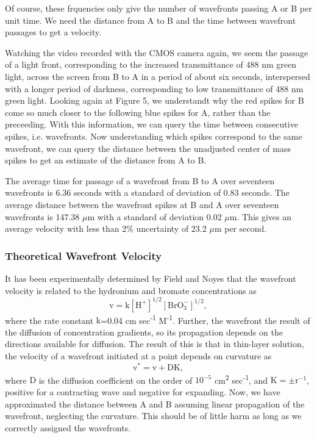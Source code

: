 \documentclass{article}
\begin{document}
Of course, these frquencies only give the number of wavefronts passing A or B per unit 
time. We need the distance from A to B and the time between wavefront passages to get a 
velocity.

Watching the video recorded with the CMOS camera again, we seem the passage of a light
front, corresponding to the increased transmittance of 488 nm green light, across the screen
from B to A in a period of about six seconds, interspersed with a longer period of darkness,
corresponding to low transmittance of 488 nm green light. Looking again at Figure 5, we
understandt why the red spikes for B come so much closer to the following blue spikes for A,
rather than the preceeding. With this information, we can query the time between consecutive
spikes, i.e. wavefronts. Now understanding which spikes correspond to the same wavefront,
we can query the distance between the unadjusted center of mass spikes to get an estimate 
of the distance from A to B.

The average time for passage of a wavefront from B to A over seventeen wavefronts is
6.36 seconds with a standard of deviation of 0.83 seconds. The average distance between
the wavefront spikes at B and A over seventeen wavefronts is 147.38 $\mu$m with a 
standard of deviation 0.02 $\mu$m. This gives an average velocity with less than 2\% 
uncertainty of 23.2 $\mu$m per second.

\subsubsection{Theoretical Wavefront Velocity}

It has been experimentally determined by Field and Noyes that the wavefront velocity is 
related to the hydronium and bromate concentrations as
\begin{equation}
\mathrm{v}=\mathrm{k} [\mathrm{H}^+]^{1/2} [\mathrm{BrO}_3^-]^{1/2},
\end{equation}
where the rate constant
$\mathrm{k}$=0.04 cm sec\textsuperscript{-1} M\textsuperscript{-1}.
Further, the wavefront the result of the diffusion of concentration gradients, so its
propagation depends on the directions available for diffusion. The result of this is that in
thin-layer solution, the velocity of a wavefront initiated at a point depends on curvature as
\begin{equation}
\mathrm{v}^*=\mathrm{v}+\mathrm{D}\mathrm{K},
\end{equation}
where $\mathrm{D}$ is the diffusion coefficient on the order of $10^{-5}$ 
cm\textsuperscript{2} sec\textsuperscript{-1}, and $\mathrm{K}=\pm \mathrm{r}^{-1}$,
positive for a contracting wave and negative for expanding. Now, we have approximated the
distance between A and B assuming linear propagation of the wavefront, neglecting the 
curvature. This should be of little harm as long as we correctly assigned the wavefronts.
\end{document}
